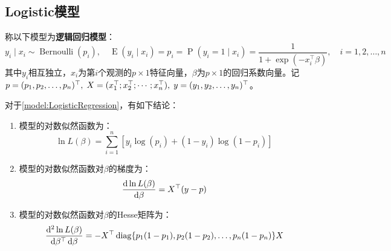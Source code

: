 \subsection{Logistic模型}
\begin{definition}\label{model:LogisticRegression}
	称以下模型为\textbf{逻辑回归模型}：
	\begin{equation*}
		y_i\mid x_i\sim\operatorname{Bernoulli}(p_i),\quad\operatorname{E}(y_i\mid x_i)=p_i=\operatorname{P}(y_i=1\mid x_i)=\frac{1}{1+\exp(-x_i^{\top}\beta)},\quad i=1,2,\dots,n
	\end{equation*}
	其中$y_i$相互独立，$x_i$为第$i$个观测的$p\times1$特征向量，$\beta$为$p\times1$的回归系数向量。记$p=(p_1, p_2, \dots, p_{n})^{\top},\;X=(x_1^{\top};x_2^{\top};\cdots;x_n^{\top}),\;y=(y_1, y_2, \dots, y_{n})^{\top}$。
\end{definition}
\begin{property}\label{prop:LogisticRegression}
	对于\cref{model:LogisticRegression}，有如下结论：
	\begin{enumerate}
		\item 模型的对数似然函数为：
		\begin{equation*}
			\ln L(\beta)=\sum_{i=1}^{n}\left[y_i\log(p_i)+(1-y_i)\log(1-p_i)\right]
		\end{equation*}
		\item 模型的对数似然函数对$\beta$的梯度为：
		\begin{equation*}
			\frac{\mathop{}\!\mathrm{d}\ln L(\beta)}{\mathop{}\!\mathrm{d}\beta}=X^{\top}(y-p)
		\end{equation*}
		\item 模型的对数似然函数对$\beta$的Hesse矩阵为：
		\begin{equation*}
			\frac{\mathop{}\!\mathrm{d}^2\ln L(\beta)}{\mathop{}\!\mathrm{d}\beta^{\top}\mathop{}\!\mathrm{d}\beta}=-X^{\top}\operatorname{diag}\{p_1(1-p_1),p_2(1-p_2),\dots,p_n(1-p_n)\}X
		\end{equation*}
	\end{enumerate}
\end{property}
